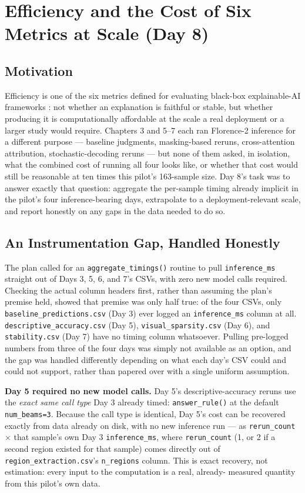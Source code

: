 \chapter{Efficiency and the Cost of Six Metrics at Scale (Day 8)}
\label{chap:day08}

\section{Motivation}

Efficiency is one of the six metrics defined for evaluating black-box explainable-AI frameworks
\citep{arreche2024exai}: not whether an explanation is faithful or stable, but whether producing it
is computationally affordable at the scale a real deployment or a larger study would require.
Chapters 3 and 5--7 each ran Florence-2 inference for a different purpose --- baseline judgments,
masking-based reruns, cross-attention attribution, stochastic-decoding reruns --- but none of them
asked, in isolation, what the combined cost of running all four looks like, or whether that cost
would still be reasonable at ten times this pilot's 163-sample size. Day 8's task was to answer
exactly that question: aggregate the per-sample timing already implicit in the pilot's four
inference-bearing days, extrapolate to a deployment-relevant scale, and report honestly on any gaps
in the data needed to do so.

\section{An Instrumentation Gap, Handled Honestly}
\label{sec:day08-gap}

The plan called for an \texttt{aggregate\_timings()} routine to pull \texttt{inference\_ms} straight
out of Days 3, 5, 6, and 7's CSVs, with zero new model calls required. Checking the actual column
headers first, rather than assuming the plan's premise held, showed that premise was only half
true: of the four CSVs, only \texttt{baseline\_predictions.csv} (Day 3) ever logged an
\texttt{inference\_ms} column at all. \texttt{descriptive\_accuracy.csv} (Day 5),
\texttt{visual\_sparsity.csv} (Day 6), and \texttt{stability.csv} (Day 7) have no timing column
whatsoever. Pulling pre-logged numbers from three of the four days was simply not available as an
option, and the gap was handled differently depending on what each day's CSV could and could not
support, rather than papered over with a single uniform assumption.

\textbf{Day 5 required no new model calls.} Day 5's descriptive-accuracy reruns use the
\emph{exact same call type} Day 3 already timed: \texttt{answer\_rule()} at the default
\texttt{num\_beams=3}. Because the call type is identical, Day 5's cost can be recovered exactly
from data already on disk, with no new inference run --- as \texttt{rerun\_count} $\times$ that
sample's own Day 3 \texttt{inference\_ms}, where \texttt{rerun\_count} (1, or 2 if a second region
existed for that sample) comes directly out of \texttt{region\_extraction.csv}'s \texttt{n\_regions}
column. This is exact recovery, not estimation: every input to the computation is a real, already-
measured quantity from this pilot's own data.


